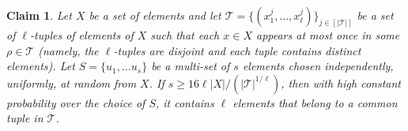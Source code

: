 \documentclass{article}
\newcommand{\calT}{{\mathcal{T}}}
\newtheorem{claim}[lemma]{Claim}
\newcommand{\commentt}[1]{ {}}
\begin{document}
\begin{claim}\label{clm:ver-num}
Let $X$ be a set of elements %
and let $\mathcal{T}=\{(x^j_1, \ldots, x^j_\ell)\}_{j\in [|\calT|]}$ be a set of $\ell$-tuples of elements of $X$ such that each $x\in X$ appears at most once in some $\rho\in \mathcal{T}$ (namely, the $\ell$-tuples are disjoint and each tuple contains distinct elements).
Let $S = \{u_1, \ldots u_s\}$ be a multi-set of $s$ elements chosen independently, uniformly, at random from $X$. %
If $s \geq 16 \ell |X| / (|\mathcal{T}|^{1/\ell})$, then with high constant probability over the choice of $S$, it contains $\ell$ elements that belong to a common tuple in $\calT$.
\end{claim}
\end{document}
